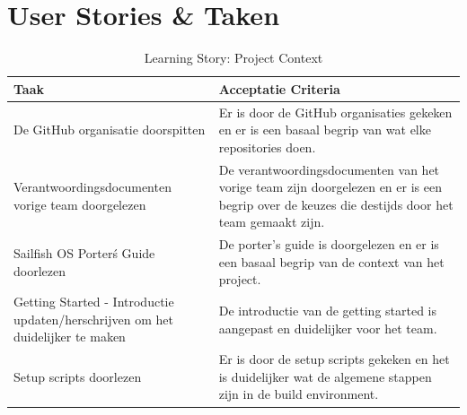 \documentclass[a4paper]{report}
\newcommand{\learningstorycolor}{PaleGreen1}
\begin{document}
\section{User Stories \& Taken}
\begin{tcolorbox}[colback=white, coltitle=black, colframe=\learningstorycolor, title=\textbf{Learning Story: }Als developer wil ik de belangrijke aspecten van de context van het project begrijpen\, namelijk de terminologie\, code- en git-structuur\, en project omvang\, zodat ik snel en efficient kan beginnen met werken.]
  \begin{table}[H]
      \centering
    \begin{tabularx}{1\textwidth}{|X|X|}
      \hline
      \cellcolor[HTML]{ffcc99} \textbf{Taak} & \cellcolor[HTML]{ffcc99} \textbf{Acceptatie Criteria} \\ 
      \hline
      De GitHub organisatie doorspitten & Er is door de GitHub organisaties gekeken en er is een basaal begrip van wat elke repositories doen. \\
      \hline
      Verantwoordingsdocumenten vorige team doorgelezen & De verantwoordingsdocumenten van het vorige team zijn doorgelezen en er is een begrip over de keuzes die destijds door het team gemaakt zijn. \\
      \hline
      Sailfish OS Porter\'s Guide doorlezen & De porter's guide is doorgelezen en er is een basaal begrip van de context van het project. \\
      \hline
      Getting Started - Introductie updaten/herschrijven om het duidelijker te maken & De introductie van de getting started is aangepast en duidelijker voor het team.\\
      \hline
      Setup scripts doorlezen & Er is door de setup scripts gekeken en het is duidelijker wat de algemene stappen zijn in de build environment.\\
      \hline
    \end{tabularx}
    \caption{Learning Story: Project Context}
  \label{table:it1:story_learn}
  \end{table}
  \end{tcolorbox}
\end{document}
